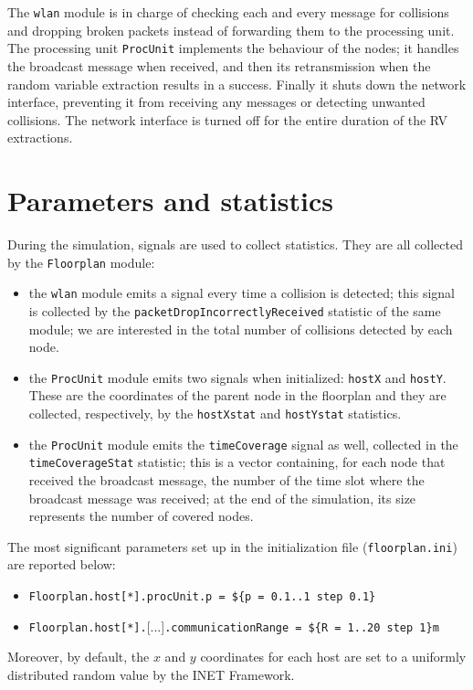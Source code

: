 The \texttt{wlan} module is in charge of checking each and every message for
collisions and dropping broken packets instead of forwarding them to the processing
unit. The processing unit \texttt{ProcUnit} implements the behaviour of the
nodes; it handles the broadcast message when received, and then its
retransmission when the random variable extraction results in a success. Finally
it shuts down the network interface, preventing it from receiving any messages
or detecting unwanted collisions. The network interface is turned off for the entire
duration of the RV extractions.
\section{Parameters and statistics}
During the simulation, signals are used to collect statistics. They are all
collected by the \texttt{Floorplan} module:
\begin{itemize}
    \item the \texttt{wlan} module emits a signal every time a collision is
    detected; this signal is collected by the
    \texttt{packetDropIncorrectlyReceived} statistic of the same module; we are
    interested in the total number of collisions detected by each node.
    \item the \texttt{ProcUnit} module emits two signals when initialized:
    \texttt{hostX} and \texttt{hostY}. These are the coordinates of the parent
	node in the floorplan and they are collected, respectively, by the
    \texttt{hostXstat} and \texttt{hostYstat} statistics.
    \item the \texttt{ProcUnit} module emits the \texttt{timeCoverage} signal as
    well, collected in the \texttt{timeCoverageStat} statistic; this is a
    vector containing, for each node that received the broadcast message, the
    number of the time slot where the broadcast message was received; at
    the end of the simulation, its size represents the number of covered nodes.
\end{itemize}
The most significant parameters set up in the initialization file
(\texttt{floorplan.ini}) are reported below:
\begin{itemize}
    \item \texttt{Floorplan.host[*].procUnit.p = \$\{p = 0.1..1 step 0.1\}}
    \item \texttt{Floorplan.host[*].}[...]\texttt{.communicationRange = \$\{R = 1..20 step 1\}m}
\end{itemize}
Moreover, by default, the $x$ and $y$ coordinates for each host are set to a
uniformly distributed random value by the INET Framework.
